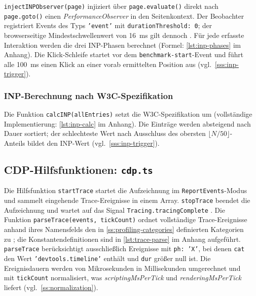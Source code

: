\texttt{injectINPObserver(page)} injiziert über \texttt{page.evaluate()} direkt nach \texttt{page.goto()} einen \textit{PerformanceObserver} in den Seitenkontext. Der Beobachter registriert Events des Typs \texttt{'event'} mit \texttt{durationThreshold: 0}; der browserseitige Mindestschwellenwert von \qty{16}{ms} gilt dennoch \cite{mocny-event-timing-2026}. Für jede erfasste Interaktion werden die drei INP-Phasen berechnet (Formel: \cref{lst:inp-phases} im Anhang). Die Klick-Schleife startet vor dem \texttt{benchmark-start}-Event und führt alle \qty{100}{ms} einen Klick an einer vorab ermittelten Position aus (vgl.~\cref{sss:inp-trigger}).

\subsubsection{INP-Berechnung nach W3C-Spezifikation}
\label{sss:impl-inp-calc}

Die Funktion \texttt{calcINP(allEntries)} setzt die W3C-Spezifikation um (vollständige Implementierung: \cref{lst:inp-calc} im Anhang). Die Einträge werden absteigend nach Dauer sortiert; der schlechteste Wert nach Ausschluss des obersten $\lfloor N/50 \rfloor$-Anteils bildet den INP-Wert (vgl.~\cref{sss:inp-trigger}).

\subsection{CDP-Hilfsfunktionen: \texttt{cdp.ts}}
\label{ss:cdp-helpers}

Die Hilfsfunktion \texttt{startTrace} startet die Aufzeichnung im \texttt{ReportEvents}-Modus und sammelt eingehende Trace-Ereignisse in einem Array. \texttt{stopTrace} beendet die Aufzeichnung und wartet auf das Signal \texttt{Tracing.tracingComplete} \cite{chrome-devtools-tracing}. Die Funktion \texttt{parseTrace(events, tickCount)} ordnet vollständige Trace-Ereignisse anhand ihres Namensfelds den in \cref{ss:profiling-categories} definierten Kategorien zu \cite{chrome-performance-reference-2024}; die Konstantendefinitionen sind in \cref{lst:trace-parse} im Anhang aufgeführt. \texttt{parseTrace} berücksichtigt ausschließlich Ereignisse mit \texttt{ph: 'X'}, bei denen \texttt{cat} den Wert \texttt{'devtools.timeline'} enthält und \texttt{dur} größer null ist. Die Ereignisdauern werden von Mikrosekunden in Millisekunden umgerechnet und mit \texttt{tickCount} normalisiert, was \textit{scriptingMsPerTick} und \textit{renderingMsPerTick} liefert (vgl.~\cref{ss:normalization}).

